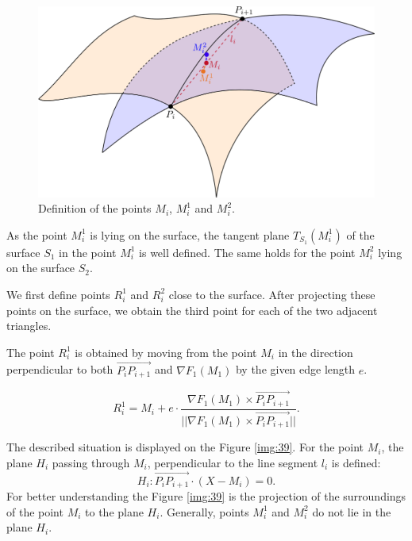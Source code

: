 \begin{figure}
    \centerline{\includegraphics[scale=0.5]{images/img38}}
    \caption[Definition of the points]
    {Definition of the points $M_i$, $M_i^1$ and $M_i^2$.}
    \label{img:38}
\end{figure}

As the point $M_i^1$ is lying on the surface, the tangent plane $T_{S_1}(M_i^1)$ 
of the surface $S_1$ in the point $M_i^1$ is well defined. The same holds for the 
point $M_i^2$ lying on the surface $S_2$. 

We first define points $R_i^1$ and $R_i^2$ close to the surface. After projecting
these points on the surface, we obtain the third point for each of the two 
adjacent triangles.

The point $R_i^1$ is obtained by moving from the point $M_i$ in the direction 
perpendicular to both $\overrightarrow{P_{i} P_{i+1}}$ and 
$\nabla{F_1}(M_1)$ by the given edge length $e$.

$$R_i^1 = M_i + e \cdot \frac{\nabla{F_1}(M_1) \times \overrightarrow{P_{i} P_{i+1}}}{||\nabla{F_1}(M_1) \times \overrightarrow{P_i P_{i+1}}||}.$$

The described situation is displayed on the Figure \ref{img:39}.
For the point $M_i$, the plane $H_i$ passing through $M_i$, perpendicular to the
line segment $l_i$ is defined:
$$H_i : \overrightarrow{P_i P_{i+1}} \cdot (X-M_i) = 0.$$
For better understanding the Figure \ref{img:39} is the projection of the surroundings
of the point $M_i$ to the plane $H_i$. Generally, points $M_i^1$ and $M_i^2$ do not lie in
the plane $H_i$. 

